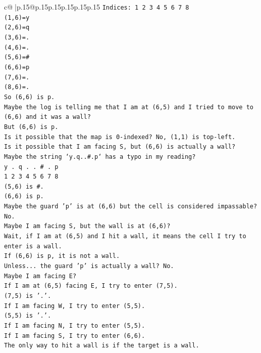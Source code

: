 \documentclass{article}
\begin{document}
{\begin{supertabular}{c@{$\;$}|p{.15\linewidth}@{}p{.15\linewidth}p{.15\linewidth}p{.15\linewidth}p{.15\linewidth}p{.15\linewidth}}
{{{\texttt{Indices: 1 2 3 4 5 6 7 8} \\
\texttt{(1,6)=y} \\
\texttt{(2,6)=q} \\
\texttt{(3,6)=.} \\
\texttt{(4,6)=.} \\
\texttt{(5,6)=\#} \\
\texttt{(6,6)=p} \\
\texttt{(7,6)=.} \\
\texttt{(8,6)=.} \\
\texttt{So (6,6) is p.} \\
\texttt{Maybe the log is telling me that I am at (6,5) and I tried to move to (6,6) and it was a wall?} \\
\texttt{But (6,6) is p.} \\
\texttt{Is it possible that the map is 0{-}indexed? No, (1,1) is top{-}left.} \\
\texttt{Is it possible that I am facing S, but (6,6) is actually a wall?} \\
\texttt{Maybe the string `y.q..\#.p` has a typo in my reading?} \\
\texttt{y . q . . \# . p} \\
\texttt{1 2 3 4 5 6 7 8} \\
\texttt{(5,6) is \#.} \\
\texttt{(6,6) is p.} \\
\texttt{Maybe the guard 'p' is at (6,6) but the cell is considered impassable? No.} \\
\texttt{Maybe I am facing S, but the wall is at (6,6)?} \\
\texttt{Wait, if I am at (6,5) and I hit a wall, it means the cell I try to enter is a wall.} \\
\texttt{If (6,6) is p, it is not a wall.} \\
\texttt{Unless... the guard 'p' is actually a wall? No.} \\
\texttt{Maybe I am facing E?} \\
\texttt{If I am at (6,5) facing E, I try to enter (7,5).} \\
\texttt{(7,5) is '.'.} \\
\texttt{If I am facing W, I try to enter (5,5).} \\
\texttt{(5,5) is '.'.} \\
\texttt{If I am facing N, I try to enter (5,5).} \\
\texttt{If I am facing S, I try to enter (6,6).} \\
\texttt{The only way to hit a wall is if the target is a wall.} \\
}}}
\end{supertabular}}
\end{document}
